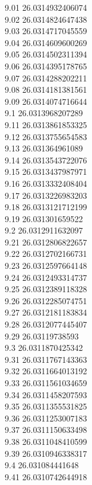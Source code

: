 {9.01	26.0314932406074\\
9.02	26.0314824647438\\
9.03	26.0314717045559\\
9.04	26.0314609600269\\
9.05	26.0314502311394\\
9.06	26.0314395178765\\
9.07	26.0314288202211\\
9.08	26.0314181381561\\
9.09	26.0314074716644\\
9.1	26.0313968207289\\
9.11	26.0313861853325\\
9.12	26.0313755654583\\
9.13	26.031364961089\\
9.14	26.0313543722076\\
9.15	26.0313437987971\\
9.16	26.0313332408404\\
9.17	26.0313226983203\\
9.18	26.0313121712199\\
9.19	26.031301659522\\
9.2	26.0312911632097\\
9.21	26.0312806822657\\
9.22	26.0312702166731\\
9.23	26.0312597664148\\
9.24	26.0312493314737\\
9.25	26.0312389118328\\
9.26	26.0312285074751\\
9.27	26.0312181183834\\
9.28	26.0312077445407\\
9.29	26.03119738593\\
9.3	26.0311870425342\\
9.31	26.0311767143363\\
9.32	26.0311664013192\\
9.33	26.0311561034659\\
9.34	26.0311458207593\\
9.35	26.0311355531825\\
9.36	26.0311253007183\\
9.37	26.0311150633498\\
9.38	26.0311048410599\\
9.39	26.0310946338317\\
9.4	26.031084441648\\
9.41	26.0310742644918\\
}
